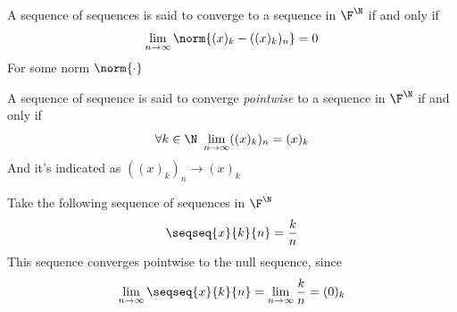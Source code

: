 \documentclass[../mmf.tex]{subfiles}
\begin{document}
\begin{dfn}
	A sequence of sequences is said to converge to a sequence in $\F^{\N}$ if and only if
	\begin{equation}
		\lim_{n\to\infty}\norm{(x)_k-((x)_k)_n}=0
		\label{eq:seqseqconv}
	\end{equation}
	For some norm $\norm{\cdot}$
\end{dfn}
\begin{dfn}
	A sequence of sequence is said to converge \textit{pointwise} to a sequence in $\F^{\N}$ if and only if
	\begin{equation}
		\forall k\in\N\ \lim_{n\to\infty}((x)_k)_n=(x)_k
		\label{eq:pointwiseconvseqseq}
	\end{equation}
	And it's indicated as $((x)_k)_n\to(x)_k$
\end{dfn}
\begin{eg}
	Take the following sequence of sequences in $\F^{\N}$
	\begin{equation*}
		\seqseq{x}{k}{n}=\frac{k}{n}
	\end{equation*}
	This sequence converges pointwise to the null sequence, since
	\begin{equation*}
		\lim_{n\to\infty}\seqseq{x}{k}{n}=\lim_{n\to\infty}\frac{k}{n}=(0)_k
	\end{equation*}
\end{eg}
\end{document}
